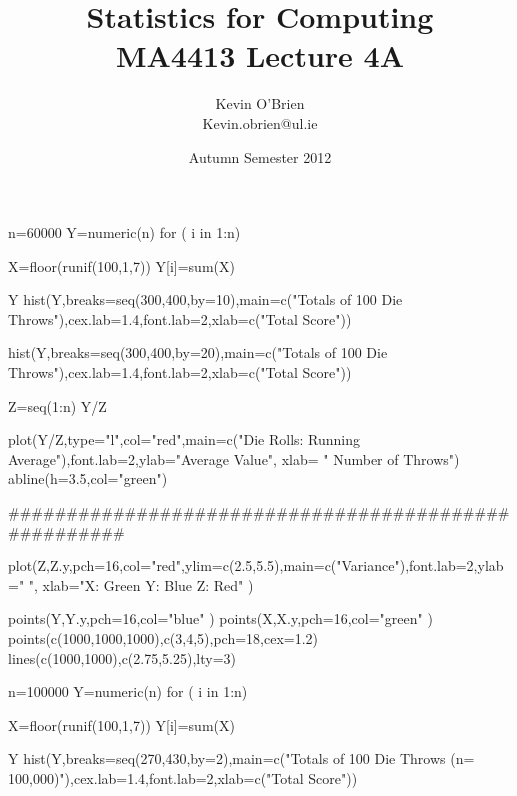 \documentclass[a4]{beamer}
\title[MA4413]{Statistics for Computing \\ {\normalsize MA4413 Lecture 4A}}
\author[Kevin O'Brien]{Kevin O'Brien \\ {\scriptsize Kevin.obrien@ul.ie}}
\date{Autumn Semester 2012}
\institute[Maths \& Stats]{Dept. of Mathematics \& Statistics, \\ University \textit{of} Limerick}
\begin{document}
\begin{frame}
\titlepage
\end{frame}




n=60000
Y=numeric(n)
for ( i in 1:n){

X=floor(runif(100,1,7))
Y[i]=sum(X)
}

Y
hist(Y,breaks=seq(300,400,by=10),main=c("Totals of 100 Die Throws"),cex.lab=1.4,font.lab=2,xlab=c("Total Score"))

hist(Y,breaks=seq(300,400,by=20),main=c("Totals of 100 Die Throws"),cex.lab=1.4,font.lab=2,xlab=c("Total Score"))



Z=seq(1:n)
Y/Z

plot(Y/Z,type="l",col="red",main=c("Die Rolls: Running Average"),font.lab=2,ylab="Average Value", xlab=
" Number of Throws")
abline(h=3.5,col="green")


#####################################################

plot(Z,Z.y,pch=16,col="red",ylim=c(2.5,5.5),main=c("Variance"),font.lab=2,ylab=" ", xlab="X: Green  Y: Blue  Z: Red" )

points(Y,Y.y,pch=16,col="blue" )
points(X,X.y,pch=16,col="green" )
points(c(1000,1000,1000),c(3,4,5),pch=18,cex=1.2)
lines(c(1000,1000),c(2.75,5.25),lty=3)



n=100000
Y=numeric(n)
for ( i in 1:n){

X=floor(runif(100,1,7))
Y[i]=sum(X)
}

Y
hist(Y,breaks=seq(270,430,by=2),main=c("Totals of 100 Die Throws (n= 100,000)"),cex.lab=1.4,font.lab=2,xlab=c("Total Score")) 
\end{document}
